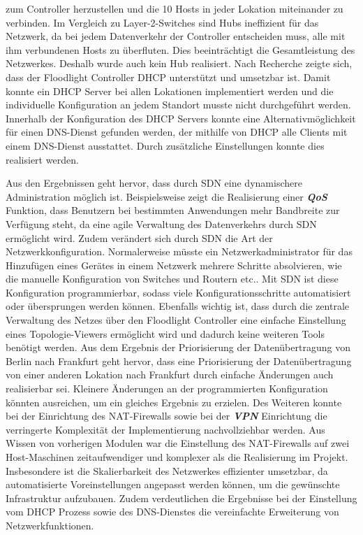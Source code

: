 \documentclass[fontsize=12pt,paper=a4,open=any,parskip=half,
  twoside=false,toc=listof,toc=bibliography,fleqn,leqno,
  captions=nooneline,captions=tableabove,british]{scrbook}
\begin{document}
{zum Controller herzustellen und die 10 Hosts in jeder Lokation miteinander zu verbinden. Im Vergleich zu Layer-2-Switches sind Hubs ineffizient für das Netzwerk, da bei jedem Datenverkehr der Controller entscheiden muss, alle mit ihm verbundenen Hosts zu überfluten. Dies beeinträchtigt die Gesamtleistung des Netzwerkes. Deshalb wurde auch kein Hub realisiert. Nach Recherche zeigte sich, dass der Floodlight Controller DHCP unterstützt und umsetzbar ist. Damit konnte ein DHCP Server bei allen Lokationen implementiert werden und die individuelle Konfiguration an jedem Standort musste nicht durchgeführt werden. Innerhalb der Konfiguration des DHCP Servers konnte eine Alternativmöglichkeit für einen DNS-Dienst gefunden werden, der mithilfe von DHCP alle Clients mit einem DNS-Dienst ausstattet. Durch zusätzliche Einstellungen konnte dies realisiert werden. \par 

Aus den Ergebnissen geht hervor, dass durch SDN eine dynamischere Administration möglich ist. Beispielsweise zeigt die Realisierung einer \textit{\textbf{QoS}} Funktion, dass Benutzern bei bestimmten Anwendungen mehr Bandbreite zur Verfügung steht, da eine agile Verwaltung des Datenverkehrs durch SDN ermöglicht wird. Zudem verändert sich durch SDN die Art der Netzwerkkonfiguration. Normalerweise müsste ein Netzwerkadministrator für das Hinzufügen eines Gerätes in einem Netzwerk mehrere Schritte absolvieren, wie die manuelle Konfiguration von Switches und Routern etc.. Mit SDN ist diese Konfiguration programmierbar, sodass viele Konfigurationsschritte automatisiert oder übersprungen werden können. Ebenfalls wichtig ist, dass durch die zentrale Verwaltung des Netzes über den Floodlight Controller eine einfache Einstellung eines Topologie-Viewers ermöglicht wird und dadurch keine weiteren Tools benötigt werden. Aus dem Ergebnis der Priorisierung der Datenübertragung von Berlin nach Frankfurt geht hervor, dass eine Priorisierung der Datenübertragung von einer anderen Lokation nach Frankfurt durch einfache Änderungen auch realisierbar sei. Kleinere Änderungen an der programmierten Konfiguration könnten ausreichen, um ein gleiches Ergebnis zu erzielen. Des Weiteren konnte bei der Einrichtung des NAT-Firewalls sowie bei der \textit{\textbf{VPN}} Einrichtung die verringerte Komplexität der Implementierung nachvollziehbar werden. Aus Wissen von vorherigen Modulen war die Einstellung des NAT-Firewalls auf zwei Host-Maschinen zeitaufwendiger und komplexer als die Realisierung im Projekt. Insbesondere ist die Skalierbarkeit des Netzwerkes effizienter umsetzbar, da automatisierte Voreinstellungen angepasst werden können, um die gewünschte Infrastruktur aufzubauen. Zudem verdeutlichen die Ergebnisse bei der Einstellung vom DHCP Prozess sowie des DNS-Dienstes die vereinfachte Erweiterung von Netzwerkfunktionen.  
\printbibliography[title=Literaturverzeichnis]

}
\end{document}
